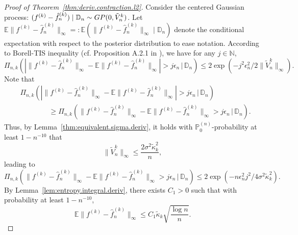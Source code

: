 \documentclass[12pt]{article}
\newcommand\data{\mathbb{D}_n}
\newcommand{\EE}{\mathbb{E}}
\newcommand{\PP}{\mathbb{P}}
\theoremstyle{plain}
\theoremstyle{nonitalicremark}
\begin{document}
\begin{appendices}
\begin{proof}[Proof of Theorem~\ref{thm:deriv.contraction.l2}]
Consider the centered Gaussian process: $(f^{(k)}-\hat{f}^{(k)}_n)\mid \data\sim {\rm GP}(0, \tilde{V}_n^k)$. Let $\EE\|f^{(k)}-\hat{f}^{(k)}_n\|_\infty =: \EE(\|f^{(k)}-\hat{f}^{(k)}_n\|_\infty \mid \data)$ denote the conditional expectation with respect to the posterior distribution to ease notation. According to Borell-TIS inequality (cf. Proposition A.2.1 in \cite{van1996weak}), we have for any $j\in \mathbb{N}$,
\begin{equation}
\Pi_{n,k}\left(\left|\|f^{(k)}-\hat{f}^{(k)}_n\|_\infty-\EE\|f^{(k)}-\hat{f}^{(k)}_n\|_\infty\right|>j\epsilon_n\,\big|\,\data\right)\leq 2\exp\left(-j^2\epsilon_n^2/2\|\tilde{V}^{k}_n\|_\infty\right).
\end{equation}
Note that
\begin{align}
& \Pi_{n,k}\left(\left|\|f^{(k)}-\hat{f}^{(k)}_n\|_\infty-\EE\|f^{(k)}-\hat{f}^{(k)}_n\|_\infty\right|>j\epsilon_n\,\big|\,\data\right)\\
& \qquad \qquad \geq \Pi_{n,k}\left(\|f^{(k)}-\hat{f}^{(k)}_n\|_\infty-\EE\|f^{(k)}-\hat{f}^{(k)}_n\|_\infty>j\epsilon_n\,\big|\,\data\right).
\end{align}
Thus, by Lemma~\ref{thm:equivalent.sigma.deriv}, it holds with $\PP_0^{(n)}$-probability at least $1-n^{-10}$ that
\begin{equation}
\|\tilde{V}^{k}_n\|_\infty \leq \frac{2\sigma^2\tilde{\kappa}_{k}^2}{n}, 
\end{equation}
leading to 
\begin{equation}
\Pi_{n,k}\left(\|f^{(k)}-\hat{f}^{(k)}_n\|_\infty-\EE\|f^{(k)}-\hat{f}^{(k)}_n\|_\infty>j\epsilon_n\,\big|\,\data\right)\leq 2\exp\left(-n\epsilon_n^2j^2/4\sigma^2\tilde{\kappa}_{k}^2\right).
\end{equation}
By Lemma~\ref{lem:entropy.integral.deriv}, there exists $C_1>0$ such that with probability at least $1-n^{-10}$,
\begin{equation}\label{eq:entropy.integral.deriv}
\EE\|f^{(k)}-\hat{f}^{(k)}_n\|_\infty\leq C_1 \tilde{\kappa}_{k}\sqrt{\frac{\log n}{n}}.
\end{equation}


\end{proof}
\end{appendices}
\end{document}
